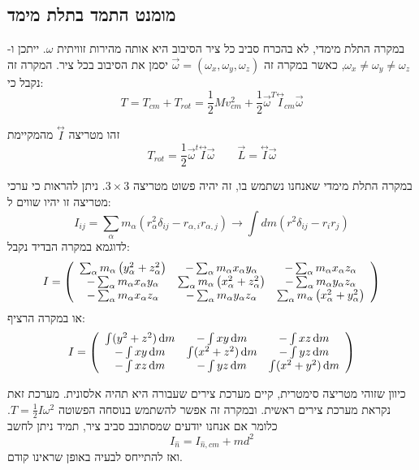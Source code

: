 \documentclass{tstextbook}
\begin{document}
\subsection{מומנט התמד בתלת מימד}

במקרה התלת מימדי, לא בהכרח סביב כל ציר הסיבוב היא אותה מהירות זוויתית \(\omega\). ייתכן ו-\(\omega_{x}\neq \omega_{y}\neq \omega_{z}\),  כאשר במקרה זה \(\vec{\omega}=\left( \omega _{x},\omega_{y},\omega_{z} \right)\) יסמן את הסיבוב בכל ציר. המקרה זה נקבל כי:
$$T=T_{c m}+T_{r o t}=\frac{1}{2}M v_{c m}^{2}+\frac{1}{2}\vec{\omega}^{T}{\stackrel{\leftrightarrow}{ I}}_{c m}\vec{\omega}$$

\begin{definition}
זהו מטריצה \(\stackrel{\leftrightarrow}{ I}\) מהמקיימת
$$T_{rot}=\frac{1}{2}\vec{\omega}^t\!\!\stackrel{\leftrightarrow}{I}\!\!\vec{\omega}\qquad \vec{L}=\stackrel{\leftrightarrow}{ I}\!\!\vec{\omega}$$

\end{definition}
במקרה התלת מימדי שאנחנו נשתמש בו, זה יהיה פשוט מטריצה \(3\times 3\).
ניתן להראות כי ערכי מטריצה זו יהיו שווים ל:
$$I_{i j}=\sum_{\alpha}m_{\alpha}\left(r_{\alpha}^{2}\delta_{i j}-r_{\alpha,i}r_{\alpha,j}\right)\to\int d m\left(r^{2}\delta_{i j}-r_{i}r_{j}\right)$$
לדוגמא במקרה הבדיד נקבל:
$$I=\left(\begin{array}{c c c}{{\sum_{\alpha}m_{\alpha}\left(y_{\alpha}^{2}+z_{\alpha}^{2}\right)}}&{{-\sum_{\alpha}m_{\alpha}x_{\alpha}y_{\alpha}}}&{{-\sum_{\alpha}m_{\alpha}x_{\alpha}z_{\alpha}}}\\ {{-\sum_{\alpha}m_{\alpha}x_{\alpha}y_{\alpha}}}&{{\sum_{\alpha}m_{\alpha}\left(x_{\alpha}^{2}+z_{\alpha}^{2}\right)}}&{{-\sum_{\alpha}m_{\alpha}y_{\alpha}z_{\alpha}}}\\ {{-\sum_{\alpha}m_{\alpha}x_{\alpha}z_{\alpha}}}&{{-\sum_{\alpha}m_{\alpha}y_{\alpha}z_{\alpha}}}&{{\sum_{\alpha}m_{\alpha}\left(x_{\alpha}^{2}+y_{\alpha}^{2}\right)}}\end{array}\right)$$
או במקרה הרציף:
$$I=\left(\begin{array}{c c c}{\int (y^2+z^2) \, \mathrm{d}m }&{-\int xy \, \mathrm{d}m }&-\int xz \, \mathrm{d}m \\ -\int xy \, \mathrm{d}m &\int (x^2+z^2) \, \mathrm{d}m &-\int yz \, \mathrm{d}m \\ -\int xz \, \mathrm{d}m &-\int yz \, \mathrm{d}m &\int (x^2+y^2) \, \mathrm{d}m \end{array}\right)$$

כיוון שזוהי מטריצה סימטרית, קיים מערכת צירים שעבורה היא תהיה אלסונית. מערכת זאת נקראת מערכת צירים ראשית. ובמקרה זה אפשר להשתמש בנוסחה הפשוטה \(T=\frac{1}{2}I\omega^2\). כלומר אם אנחנו יודעים שמסתובב סביב ציר, תמיד ניתן לחשב $$I_{\hat{n}}=I_{\hat{n},c m}+m d^{2}$$ ואז להתייחס לבעיה באופן שראינו קודם.
\end{document}
